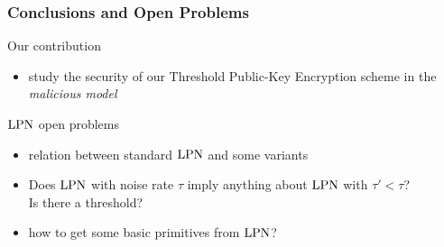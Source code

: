 \begin{frame}
 \frametitle{Conclusions and Open Problems}
 
 \begin{block}{Our contribution}
\begin{itemize}
 \item study the security of our Threshold Public-Key Encryption scheme in the \emph{malicious model}
\end{itemize}
  
 \end{block}
 
 \begin{block}{$\mathrm{LPN}$ open problems}
  \begin{itemize}
   \item<2-> relation between standard $\mathrm{LPN}$ and some variants
   \item<3-> Does $\mathrm{LPN}$ with noise rate $\tau$ imply anything about $\mathrm{LPN}$ with $\tau' < \tau$? \\ Is there a threshold?
   \item<4-> how to get some basic primitives from $\mathrm{LPN}$?
  \end{itemize}

 \end{block}
 

\end{frame}

\appendix
{}
\setcounter{finalframe}{\value{framenumber}}

\setcounter{framenumber}{\value{finalframe}}

